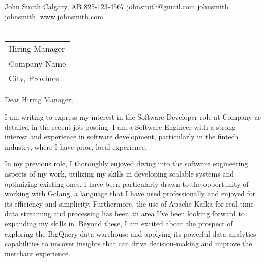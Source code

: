 \documentclass[letterpaper]{resume_config}
\begin{document}
\Header
    {John Smith} %
    {Calgary, AB} %
    {825-123-4567} %
    {johnsmith@gmail.com} %
    {johnsmith} %
    {johnsmith} %
    [www.johnsmith.com] %

\section{}


\vspace{0.5in}
\begin{tabular}{@{} l}
	Hiring Manager \\
	Company Name \\
	City, Province \\
\end{tabular}

\bigskip %
\bigskip %

Dear Hiring Manager,

\bigskip %


I am writing to express my interest in the Software Developer role at Company as detailed in the recent job posting. I am a Software Engineer with a strong interest and experience in software development, particularly in the fintech industry, where I have prior, local experience.

\bigskip

In my previous role, I thoroughly enjoyed diving into the software engineering aspects of my work, utilizing my skills in developing scalable systems and optimizing existing ones. I have been particularly drawn to the opportunity of working with Golang, a language that I have used professionally and enjoyed for its efficiency and simplicity. Furthermore, the use of Apache Kafka for real-time data streaming and processing has been an area I've been looking forward to expanding my skills in. Beyond these, I am excited about the prospect of exploring the BigQuery data warehouse and applying its powerful data analytics capabilities to uncover insights that can drive decision-making and improve the merchant experience.
\end{document}
